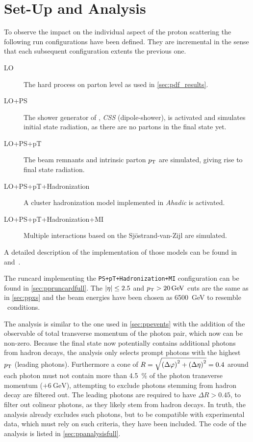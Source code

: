 \section{Set-Up and Analysis}%
\label{sec:setupan}

To observe the impact on the individual aspect of the proton
scattering the following run configurations have been defined. They
are incremental in the sense that each subsequent configuration
extents the previous one.

\begin{description}
\item[LO] The hard process on parton level as used in \cref{sec:pdf_results}.
\item[LO+PS] The shower generator of \sherpa, \emph{CSS} (dipole-shower),
  is activated and simulates initial state radiation, as there are no
  partons in the final state yet.
\item[LO+PS+pT] The beam remnants and intrinsic parton
  \(p_\mathrm{T}\) are simulated, giving rise to final state radiation.
\item[LO+PS+pT+Hadronization] A cluster hadronization model
  implemented in \emph{Ahadic} is activated.
\item[LO+PS+pT+Hadronization+MI] Multiple interactions based on the
  Sj\"ostrand-van-Zijl are simulated.
\end{description}

A detailed description of the implementation of those models can be
found in~\cite{Gleisberg:2008ta} and~\cite{Bothmann:2019yzt}.

The runcard implementing the \texttt{PS+pT+Hadronization+MI}
configuration can be found in \cref{sec:ppruncardfull}. The
\(\abs{\eta}\leq 2.5\) and \(p_\mathrm{T} > \SI{20}{\giga\electronvolt}\) cuts are
the same as in \cref{sec:ppxs} and the beam energies have been chosen
as \SI{6500}{\giga\electronvolt} to resemble \lhc\ conditions.

The analysis is similar to the one used in \cref{sec:ppevents} with
the addition of the observable of total transverse momentum of the
photon pair, which now can be non-zero. Because the final state now
potentially contains additional photons from hadron decays, the
analysis only selects prompt photons with the highest \(p_\mathrm{T}\) (leading
photons). Furthermore a cone of
\(R = \sqrt{\qty(\Delta\varphi)^2 + \qty(\Delta\eta)^2} = 0.4\) around
each photon must not contain more than \SI{4.5}{\percent} of the
photon transverse momentum (\(+ \SI{6}{\giga\electronvolt}\)),
attempting to exclude photons stemming from hadron decay are filtered
out. The leading photons are required to have \(\Delta R > 0.45\), to
filter out colinear photons, as they likely stem from hadron
decays. In truth, the analysis already excludes such photons, but to
be compatible with experimental data, which must rely on such
criteria, they have been included. The code of the analysis is listed
in \cref{sec:ppanalysisfull}.


